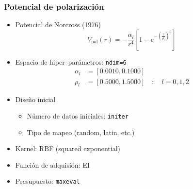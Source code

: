 \documentclass{beamer}
\begin{document}
\begin{frame}
\frametitle{Potencial de polarización}

\begin{itemize}
\item Potencial de Norcross (1976)
\begin{equation*}
  V_{\textrm{pol}}(r) = -\frac{\alpha_l}{r^4}\left[1-e^{-\left(\tfrac{r}{\rho_l}\right)^6}\right]
\end{equation*}
\item Espacio de hiper--parámetros: \texttt{ndim=6}
\begin{align*} 
  \alpha_l &=[0.0010,0.1000] \\
  \rho_l   &=[0.5000,1.5000] \quad:\quad l=0,1,2
\end{align*}
\item Diseño inicial
  \begin{itemize}
    \item Número de datos iniciales: \texttt{initer}
    \item Tipo de mapeo (random, latin, etc.)
  \end{itemize}
\item Kernel: RBF (squared exponential)
\item Función de adquisión: EI
\item Presupuesto: \texttt{maxeval}
\end{itemize}


\end{frame}
\end{document}
